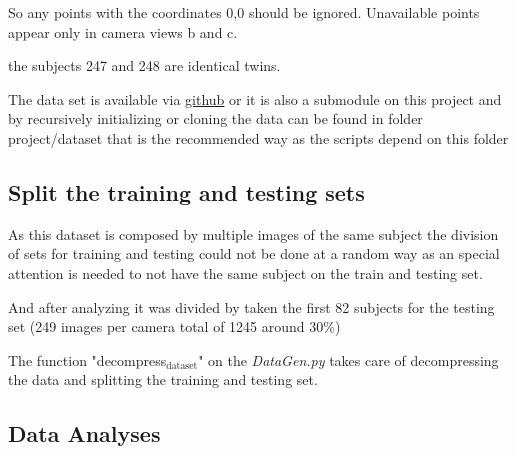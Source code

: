 \documentclass[11pt]{article}
\begin{document}
So any points with the coordinates 0,0 should be ignored.  Unavailable
points appear only in camera views b and c.  

the subjects 247 and 248 are identical twins.

The data set is available via \href{https://github.com/StephenMilborrow/muct}{github} or it is also a submodule on this
project and by recursively initializing or cloning the data can be found in 
folder project/dataset that is the recommended way as the scripts depend on
this folder 


\subsection{Split the training and testing sets}
\label{sec:org1b3e9ff}

As this dataset is composed by multiple images of the same subject the
division of sets for training and testing could not be done at a random way
as an special attention is needed to not have the same subject on the train
and testing set.

And after analyzing it was divided by taken the first 82 subjects for the
testing set (249 images per camera total of 1245 around 30\%)

The function "decompress\(_{\text{dataset}}\)" on the \emph{DataGen.py} takes care of
decompressing the data and splitting the training and testing set. 

\subsection{Data Analyses}
\label{sec:org0a7b42f}
\end{document}
